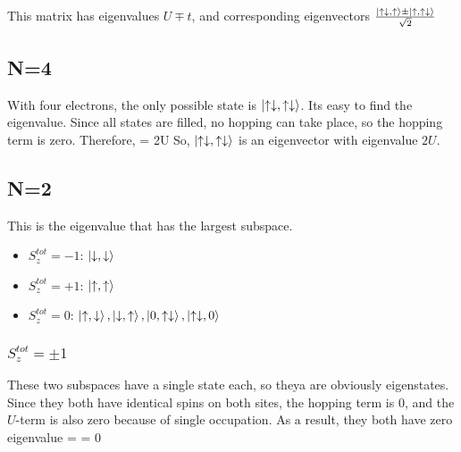 \documentclass[12pt]{article}
\begin{document}
This matrix has eigenvalues \(U \mp t\), and corresponding eigenvectors \(\frac{\ket{\uparrow\downarrow,\uparrow} \pm \ket{\uparrow,\uparrow\downarrow}}{\sqrt{2}}\)
\subsection{N=4}
With four electrons, the only possible state is \(\ket{\uparrow\downarrow,\uparrow\downarrow}\). Its easy to find the eigenvalue. Since all states are filled, no hopping can take place, so the hopping term is zero. Therefore,
\beq
\ham \ket{\uparrow\downarrow,\uparrow\downarrow} = 2U \ket{\uparrow\downarrow,\uparrow\downarrow}
\eeq
So, \(\ket{\uparrow\downarrow,\uparrow\downarrow}\) is an eigenvector with eigenvalue \(2U\).
\subsection{N=2}
This is the eigenvalue that has the largest subspace.
\begin{itemize}
\item \(S_z^{tot} = -1\): \(\ket{\downarrow,\downarrow}\)
\item \(S_z^{tot} = +1\): \(\ket{\uparrow,\uparrow}\)
\item \(S_z^{tot} = 0\):  \(\ket{\uparrow,\downarrow},\ket{\downarrow,\uparrow},\ket{0,\uparrow\downarrow},\ket{\uparrow\downarrow,0}\)
\end{itemize}

\subsubsection{\(S_z^{tot} = \pm 1\)}
These two subspaces have a single state each, so theya are obviously eigenstates. Since they both have identical spins on both sites, the hopping term is 0, and the \(U\)-term is also zero because of single occupation. As a result, they both have zero eigenvalue
\beq
\ham \ket{\downarrow,\downarrow} = \ham \ket{\uparrow,\uparrow} = 0
\eeq
\end{document}
